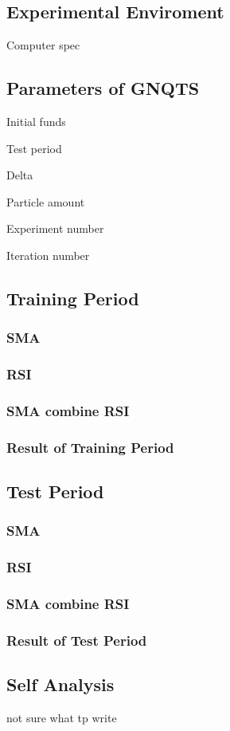 \documentclass[../main.tex]{subfiles}
\begin{document}
\subsection{Experimental Enviroment}
Computer spec

\subsection{Parameters of GNQTS}
Initial funds

Test period

Delta

Particle amount

Experiment number

Iteration number

\subsection{Training Period}

\subsubsection{SMA}


\subsubsection{RSI}


\subsubsection{SMA combine RSI}


\subsubsection{Result of Training Period}


\subsection{Test Period}


\subsubsection{SMA}


\subsubsection{RSI}


\subsubsection{SMA combine RSI}


\subsubsection{Result of Test Period}


\subsection{Self Analysis}
not sure what tp write
\end{document}
